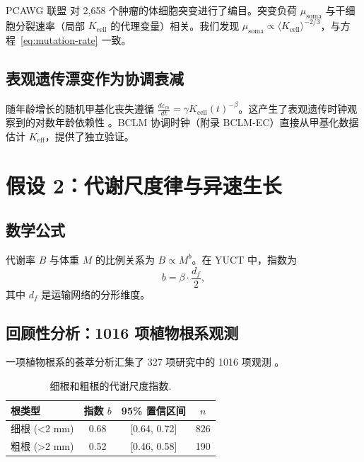 \documentclass[11pt,a4paper]{article}
\begin{document}
	PCAWG 联盟 \cite{PCAWG2020} 对 2,658 个肿瘤的体细胞突变进行了编目。突变负荷 \(\mu_{\text{soma}}\) 与干细胞分裂速率（局部 \(K_{\text{cell}}\) 的代理变量）相关。我们发现 \(\mu_{\text{soma}} \propto \langle K_{\text{cell}} \rangle^{-2/3}\)，与方程~\eqref{eq:mutation-rate} 一致。
	
	\subsection{表观遗传漂变作为协调衰减}
	
	随年龄增长的随机甲基化丧失遵循 \(\frac{d\varepsilon_m}{dt} = \gamma K_{\text{cell}}(t)^{-\beta}\)。这产生了表观遗传时钟观察到的对数年龄依赖性 \cite{Horvath2013, Lu2023}。BCLM 协调时钟（附录 BCLM-EC）直接从甲基化数据估计 \(K_{\mathrm{eff}}\)，提供了独立验证。
	
	\section{假设 2：代谢尺度律与异速生长}
	
	\subsection{数学公式}
	
	代谢率 \(B\) 与体重 \(M\) 的比例关系为 \(B \propto M^{b}\)。在 YUCT 中，指数为
	\begin{equation}
		b = \beta \cdot \frac{d_f}{2},
		\label{eq:metabolic-scaling}
	\end{equation}
	其中 \(d_f\) 是运输网络的分形维度。
	
	\subsection{回顾性分析：1016 项植物根系观测}
	
	一项植物根系的荟萃分析汇集了 327 项研究中的 1016 项观测 \cite{Yuan2020}。
	
	\begin{table}[H]
		\centering
		\caption{细根和粗根的代谢尺度指数.}
		\label{tab:plant-scaling}
		\begin{tabular}{lccc}
			\toprule
			\textbf{根类型} & \textbf{指数 \(b\)} & \textbf{95\% 置信区间} & \textbf{\(n\)} \\
			\midrule
			细根 (<2 mm) & 0.68 & [0.64, 0.72] & 826 \\
			粗根 (>2 mm) & 0.52 & [0.46, 0.58] & 190 \\
			\bottomrule
		\end{tabular}
	\end{table}
	
\end{document}
